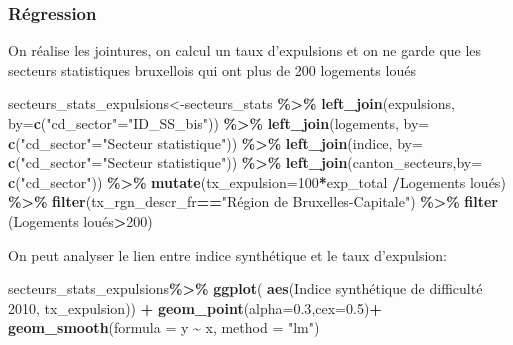 \documentclass[
]{book}
\newenvironment{Shaded}{\begin{snugshade}}{\end{snugshade}}
\newcommand{\AttributeTok}[1]{\textcolor[rgb]{0.13,0.29,0.53}{#1}}
\newcommand{\DecValTok}[1]{\textcolor[rgb]{0.00,0.00,0.81}{#1}}
\newcommand{\FloatTok}[1]{\textcolor[rgb]{0.00,0.00,0.81}{#1}}
\newcommand{\FunctionTok}[1]{\textcolor[rgb]{0.13,0.29,0.53}{\textbf{#1}}}
\newcommand{\NormalTok}[1]{#1}
\newcommand{\OtherTok}[1]{\textcolor[rgb]{0.56,0.35,0.01}{#1}}
\newcommand{\SpecialCharTok}[1]{\textcolor[rgb]{0.81,0.36,0.00}{\textbf{#1}}}
\newcommand{\StringTok}[1]{\textcolor[rgb]{0.31,0.60,0.02}{#1}}
\begin{document}
\hypertarget{ruxe9gression}{%
\subsubsection{Régression}\label{ruxe9gression}}

On réalise les jointures, on calcul un taux d'expulsions et on ne garde
que les secteurs statistiques bruxellois qui ont plus de 200 logements
loués

\begin{Shaded}
\begin{Highlighting}[]
\NormalTok{secteurs\_stats\_expulsions}\OtherTok{\textless{}{-}}\NormalTok{secteurs\_stats }\SpecialCharTok{\%\textgreater{}\%}
  \FunctionTok{left\_join}\NormalTok{(expulsions, }\AttributeTok{by=}\FunctionTok{c}\NormalTok{(}\StringTok{"cd\_sector"}\OtherTok{=}\StringTok{"ID\_SS\_bis"}\NormalTok{)) }\SpecialCharTok{\%\textgreater{}\%}
  \FunctionTok{left\_join}\NormalTok{(logements, }\AttributeTok{by=} \FunctionTok{c}\NormalTok{(}\StringTok{"cd\_sector"}\OtherTok{=}\StringTok{"Secteur statistique"}\NormalTok{)) }\SpecialCharTok{\%\textgreater{}\%}
  \FunctionTok{left\_join}\NormalTok{(indice, }\AttributeTok{by=} \FunctionTok{c}\NormalTok{(}\StringTok{"cd\_sector"}\OtherTok{=}\StringTok{"Secteur statistique"}\NormalTok{)) }\SpecialCharTok{\%\textgreater{}\%}
  \FunctionTok{left\_join}\NormalTok{(canton\_secteurs,}\AttributeTok{by=} \FunctionTok{c}\NormalTok{(}\StringTok{"cd\_sector"}\NormalTok{)) }\SpecialCharTok{\%\textgreater{}\%}
  \FunctionTok{mutate}\NormalTok{(}\AttributeTok{tx\_expulsion=}\DecValTok{100}\SpecialCharTok{*}\NormalTok{exp\_total }\SpecialCharTok{/}\StringTok{\textasciigrave{}}\AttributeTok{Logements loués}\StringTok{\textasciigrave{}}\NormalTok{) }\SpecialCharTok{\%\textgreater{}\%}
  \FunctionTok{filter}\NormalTok{(tx\_rgn\_descr\_fr}\SpecialCharTok{==}\StringTok{"Région de Bruxelles{-}Capitale"}\NormalTok{) }\SpecialCharTok{\%\textgreater{}\%}
  \FunctionTok{filter}\NormalTok{ (}\StringTok{\textasciigrave{}}\AttributeTok{Logements loués}\StringTok{\textasciigrave{}}\SpecialCharTok{\textgreater{}}\DecValTok{200}\NormalTok{)}
\end{Highlighting}
\end{Shaded}

On peut analyser le lien entre indice synthétique et le taux
d'expulsion:

\begin{Shaded}
\begin{Highlighting}[]
\NormalTok{secteurs\_stats\_expulsions}\SpecialCharTok{\%\textgreater{}\%}
  \FunctionTok{ggplot}\NormalTok{( }\FunctionTok{aes}\NormalTok{(}\StringTok{\textasciigrave{}}\AttributeTok{Indice synthétique de difficulté 2010}\StringTok{\textasciigrave{}}\NormalTok{, tx\_expulsion)) }\SpecialCharTok{+}
  \FunctionTok{geom\_point}\NormalTok{(}\AttributeTok{alpha=}\FloatTok{0.3}\NormalTok{,}\AttributeTok{cex=}\FloatTok{0.5}\NormalTok{)}\SpecialCharTok{+}
  \FunctionTok{geom\_smooth}\NormalTok{(}\AttributeTok{formula =}\NormalTok{ y }\SpecialCharTok{\textasciitilde{}}\NormalTok{ x, }\AttributeTok{method =} \StringTok{"lm"}\NormalTok{)}
\end{Highlighting}
\end{Shaded}
\end{document}

